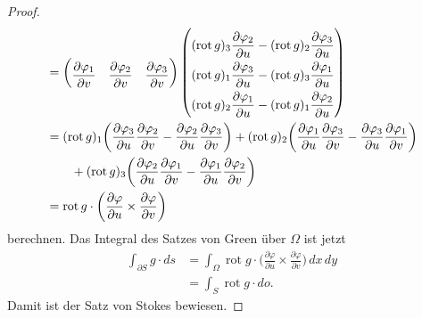 \begin{proof}
\begin{align*}
&=
\begin{pmatrix}
\displaystyle
\frac{\partial \varphi_1}{\partial v}&
\displaystyle
\frac{\partial \varphi_2}{\partial v}&
\displaystyle
\frac{\partial \varphi_3}{\partial v}
\end{pmatrix}
{\renewcommand{\arraystretch}{2.0}
\begin{pmatrix}
\displaystyle
(\operatorname{rot}g)_3 \frac{\partial\varphi_2}{\partial u}
-
(\operatorname{rot}g)_2 \frac{\partial\varphi_3}{\partial u}
\\
\displaystyle
(\operatorname{rot}g)_1 \frac{\partial\varphi_3}{\partial u}
-
(\operatorname{rot}g)_3 \frac{\partial\varphi_1}{\partial u}
\\
\displaystyle
(\operatorname{rot}g)_2 \frac{\partial\varphi_1}{\partial u}
-
(\operatorname{rot}g)_1 \frac{\partial\varphi_2}{\partial u}
\end{pmatrix}}
\\
&=
(\operatorname{rot}g)_1
\biggl(
\frac{\partial\varphi_3}{\partial u}
\frac{\partial\varphi_2}{\partial v}
-
\frac{\partial\varphi_2}{\partial u}
\frac{\partial\varphi_3}{\partial v}
\biggr)
+
(\operatorname{rot}g)_2
\biggl(
\frac{\partial\varphi_1}{\partial u}
\frac{\partial\varphi_3}{\partial v}
-
\frac{\partial\varphi_3}{\partial u}
\frac{\partial\varphi_1}{\partial v}
\biggr)
\\
&\qquad
+
(\operatorname{rot}g)_3
\biggl(
\frac{\partial\varphi_2}{\partial u}
\frac{\partial\varphi_1}{\partial v}
-
\frac{\partial\varphi_1}{\partial u}
\frac{\partial\varphi_2}{\partial v}
\biggr)
\\
&=
\operatorname{rot}g\cdot
\biggl(
\frac{\partial\varphi}{\partial u}
\times
\frac{\partial\varphi}{\partial v}
\biggr)
\end{align*}
berechnen.
Das Integral des Satzes von Green über $\Omega$ ist jetzt
\begin{align*}
\int_{\partial S} g\cdot ds
&=
\int_\Omega
\operatorname{rot}g
\cdot
\biggl(
\frac{\partial\varphi}{\partial u}
\times
\frac{\partial\varphi}{\partial v}
\biggr)\,dx\,dy
\\
&=
\int_S
\operatorname{rot} g
\cdot
do.
\end{align*}
Damit ist der Satz von Stokes bewiesen.
\end{proof}

%
%
